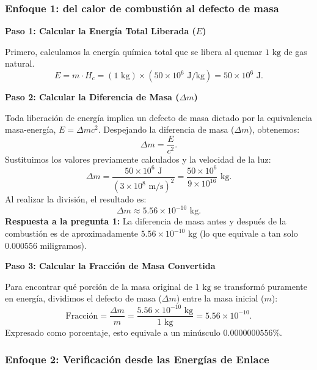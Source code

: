 \documentclass[11pt,a4paper]{book}
\begin{document}
\subsubsection*{Enfoque 1: del calor de combustión al defecto de masa}

\textbf{Paso 1: Calcular la Energía Total Liberada ($E$)}

Primero, calculamos la energía química total que se libera al quemar $1 \text{ kg}$ de gas natural.
\begin{equation}
    E = m \cdot H_c = (1 \text{ kg}) \times (50 \times 10^6 \text{ J/kg}) = 50 \times 10^6 \text{ J}.
\end{equation}

\textbf{Paso 2: Calcular la Diferencia de Masa ($\Delta m$)}

Toda liberación de energía implica un defecto de masa dictado por la equivalencia masa-energía, $E = \Delta m c^2$. Despejando la diferencia de masa ($\Delta m$), obtenemos:
\begin{equation}
    \Delta m = \frac{E}{c^2}.
\end{equation}
Sustituimos los valores previamente calculados y la velocidad de la luz:
\begin{equation}
    \Delta m = \frac{50 \times 10^6 \text{ J}}{(3 \times 10^8 \text{ m/s})^2} = \frac{50 \times 10^6}{9 \times 10^{16}} \text{ kg}.
\end{equation}
Al realizar la división, el resultado es:
\begin{equation}
    \Delta m \approx 5.56 \times 10^{-10} \text{ kg}.
\end{equation}
\textbf{Respuesta a la pregunta 1:} La diferencia de masa antes y después de la combustión es de aproximadamente $5.56 \times 10^{-10} \text{ kg}$ (lo que equivale a tan solo $0.000556$ miligramos).

\textbf{Paso 3: Calcular la Fracción de Masa Convertida}

Para encontrar qué porción de la masa original de $1 \text{ kg}$ se transformó puramente en energía, dividimos el defecto de masa ($\Delta m$) entre la masa inicial ($m$):
\begin{equation}
    \text{Fracción} = \frac{\Delta m}{m} = \frac{5.56 \times 10^{-10} \text{ kg}}{1 \text{ kg}} = 5.56 \times 10^{-10}.
\end{equation}
Expresado como porcentaje, esto equivale a un minúsculo $0.0000000556\%$.

\subsubsection*{Enfoque 2: Verificación desde las Energías de Enlace}
\end{document}
